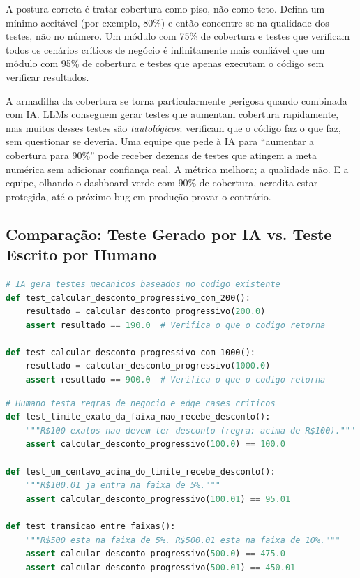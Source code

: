 A postura correta é tratar cobertura como piso, não como teto. Defina um mínimo
aceitável (por exemplo, 80\%) e então concentre-se na qualidade dos testes,
não no número. Um módulo com 75\% de cobertura e testes que verificam todos os
cenários críticos de negócio é infinitamente mais confiável que um módulo com
95\% de cobertura e testes que apenas executam o código sem verificar resultados.

A armadilha da cobertura se torna particularmente perigosa quando combinada com
IA. LLMs conseguem gerar testes que aumentam cobertura rapidamente, mas muitos
desses testes são \textit{tautológicos}: verificam que o código faz o que faz,
sem questionar se deveria. Uma equipe que pede à IA para ``aumentar a cobertura
para 90\%'' pode receber dezenas de testes que atingem a meta numérica sem
adicionar confiança real. A métrica melhora; a qualidade não. E a equipe, olhando
o dashboard verde com 90\% de cobertura, acredita estar protegida, até o
próximo bug em produção provar o contrário.

\subsection{Comparação: Teste Gerado por IA vs. Teste Escrito por Humano}

\begin{lstlisting}[language=Python, caption={Teste gerado por IA (tipicamente)}]
# IA gera testes mecanicos baseados no codigo existente
def test_calcular_desconto_progressivo_com_200():
    resultado = calcular_desconto_progressivo(200.0)
    assert resultado == 190.0  # Verifica o que o codigo retorna

def test_calcular_desconto_progressivo_com_1000():
    resultado = calcular_desconto_progressivo(1000.0)
    assert resultado == 900.0  # Verifica o que o codigo retorna
\end{lstlisting}

\begin{lstlisting}[language=Python, caption={Teste escrito por humano (idealmente)}]
# Humano testa regras de negocio e edge cases criticos
def test_limite_exato_da_faixa_nao_recebe_desconto():
    """R$100 exatos nao devem ter desconto (regra: acima de R$100)."""
    assert calcular_desconto_progressivo(100.0) == 100.0

def test_um_centavo_acima_do_limite_recebe_desconto():
    """R$100.01 ja entra na faixa de 5%."""
    assert calcular_desconto_progressivo(100.01) == 95.01

def test_transicao_entre_faixas():
    """R$500 esta na faixa de 5%. R$500.01 esta na faixa de 10%."""
    assert calcular_desconto_progressivo(500.0) == 475.0
    assert calcular_desconto_progressivo(500.01) == 450.01
\end{lstlisting}

